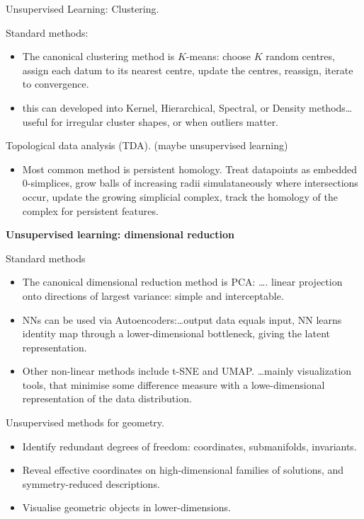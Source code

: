 \medskip\noindent
Unsupervised Learning: Clustering.

\medskip\noindent
Standard methods:
\begin{itemize}
\item The canonical clustering method is
$K$-means: choose $K$ random centres, assign
each datum to its nearest centre, update the
centres, reassign, iterate to convergence.
\item  this can developed into Kernel,
Hierarchical, Spectral, or Density methods…
useful for irregular cluster shapes, or when
outliers matter.
\end{itemize}

\noindent
Topological data analysis (TDA).
(maybe unsupervised learning)
\begin{itemize}
\item Most common method is persistent
homology.
Treat datapoints as embedded 0-simplices,
grow balls of increasing radii
simulataneously where intersections occur,
update the growing simplicial complex,
track the homology of the complex for
persistent features.
\end{itemize}

\medskip\noindent
{\bf Unsupervised learning: dimensional
reduction}

\medskip\noindent
Standard methods
\begin{itemize}
\item The canonical dimensional reduction
method is PCA: …. linear projection onto
directions of largest variance: simple and
interceptable.
\item NNs can be used via
Autoencoders:…output data equals input, NN
learns identity map through a
lower-dimensional bottleneck, giving the
latent representation.
\item Other non-linear methods include t-SNE
and UMAP.
…mainly visualization tools, that minimise
some difference measure with a
lowe-dimensional representation of the data
distribution.
\end{itemize}

\noindent
Unsupervised methods for geometry.
\begin{itemize}
\item Identify redundant degrees of freedom:
coordinates, submanifolds, invariants.
\item Reveal effective coordinates on
high-dimensional families of solutions, and
symmetry-reduced descriptions.
\item Visualise geometric objects in
lower-dimensions.
\end{itemize}



